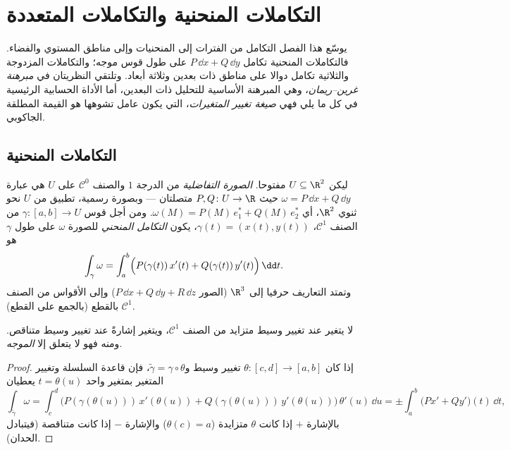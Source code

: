 \chapter{التكاملات المنحنية والتكاملات المتعددة}\label{ch:b2:multint}

يوسّع هذا الفصل التكامل من الفترات إلى المنحنيات وإلى مناطق المستوي
والفضاء. فالتكاملات المنحنية تكامل \emph{} $P\,\dd x + Q\,\dd y$ على
طول قوس موجه؛ والتكاملات المزدوجة والثلاثية تكامل دوالا على مناطق
ذات بعدين وثلاثة أبعاد. وتلتقي النظريتان في \emph{مبرهنة غرين--ريمان}،
وهي المبرهنة الأساسية للتحليل ذات البعدين، أما الأداة الحسابية
الرئيسية في كل ما يلي فهي \emph{صيغة تغيير المتغيرات}، التي يكون
عامل تشوهها هو القيمة المطلقة  الجاكوبي.

\section{التكاملات المنحنية}

\begin{definition}\label{def:b2:multint:lineint}
ليكن $U \subseteq \R^2$ مفتوحا. \emph{الصورة التفاضلية} من
الدرجة $1$ والصنف $\mathcal{C}^0$ على $U$ هي عبارة $\omega = P\,\dd x + Q\,\dd y$ حيث $P, Q \colon U \to \R$ متصلتان
--- وبصورة رسمية، تطبيق  من $U$ نحو ثنوي $\R^2$، أي $\omega(M) = P(M)\,e_1^* + Q(M)\,e_2^*$.
ومن أجل قوس $\gamma \colon [a, b] \to U$ من الصنف $\mathcal{C}^1$، $\gamma(t) =
(x(t), y(t))$، يكون \emph{التكامل
المنحني} للصورة $\omega$ على طول $\gamma$ هو
\[
\int_\gamma \omega
= \int_a^b \Bigl(P(\gamma(t))\,x'(t)
+ Q(\gamma(t))\,y'(t)\Bigr)\,\dd t .
\]
وتمتد التعاريف حرفيا إلى $\R^3$ (الصور $P\,\dd x +
Q\,\dd y + R\,\dd z$) وإلى الأقواس من
الصنف $\mathcal{C}^1$ بالقطع (بالجمع على القطع).
\end{definition}

\begin{proposition}\label{prop:b2:multint:lineinv}
لا يتغير  عند تغيير وسيط متزايد من الصنف $\mathcal{C}^1$،
ويتغير إشارةً عند تغيير وسيط متناقص. ومنه فهو لا يتعلق إلا  \emph{الموجه}.
\end{proposition}

\begin{proof}
إذا كان $\theta \colon [c, d] \to [a, b]$ تغيير وسيط و$\tilde\gamma = \gamma \circ \theta$، فإن قاعدة السلسلة وتغيير المتغير
بمتغير واحد $t = \theta(u)$ يعطيان
\[
\int_{\tilde\gamma}\omega
= \int_c^d \bigl(P(\gamma(\theta(u)))\,x'(\theta(u))
+ Q(\gamma(\theta(u)))\,y'(\theta(u))\bigr)\,\theta'(u)\,\dd u
= \pm\int_a^b \bigl(Px' + Qy'\bigr)(t)\,\dd t ,
\]
بالإشارة $+$ إذا كانت $\theta$ متزايدة ($\theta(c) = a$) والإشارة $-$ إذا
كانت متناقصة (فيتبادل الحدان).
\end{proof}

